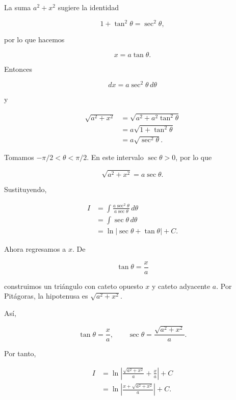 La suma $a^2+x^2$ sugiere la identidad

\[
1+\tan^2\theta=\sec^2\theta,
\]

por lo que hacemos

\[
\boxed{x=a\tan\theta}.
\]

Entonces

\[
dx=a\sec^2\theta\,d\theta
\]

y

\begin{align*}
\sqrt{a^2+x^2}
&=\sqrt{a^2+a^2\tan^2\theta}\\
&=a\sqrt{1+\tan^2\theta}\\
&=a\sqrt{\sec^2\theta}.
\end{align*}

Tomamos $-\pi/2<\theta<\pi/2$. En este intervalo $\sec\theta>0$, por lo que

\[
\sqrt{a^2+x^2}=a\sec\theta.
\]

Sustituyendo,

\begin{align*}
I
&=\int\frac{a\sec^2\theta}{a\sec\theta}\,d\theta\\
&=\int\sec\theta\,d\theta\\
&=\ln|\sec\theta+\tan\theta|+C.
\end{align*}

Ahora regresamos a $x$. De

\[
\tan\theta=\frac{x}{a}
\]

construimos un triángulo con cateto opuesto $x$ y cateto adyacente $a$.
Por Pitágoras, la hipotenusa es $\sqrt{a^2+x^2}$.

\begin{center}
\end{center}

Así,

\[
\tan\theta=\frac{x}{a},
\qquad
\sec\theta=\frac{\sqrt{a^2+x^2}}{a}.
\]

Por tanto,

\begin{align*}
I
&=\ln\left|
\frac{\sqrt{a^2+x^2}}{a}+\frac{x}{a}
\right|+C\\
&=\ln\left|
\frac{x+\sqrt{a^2+x^2}}{a}
\right|+C.
\end{align*}

